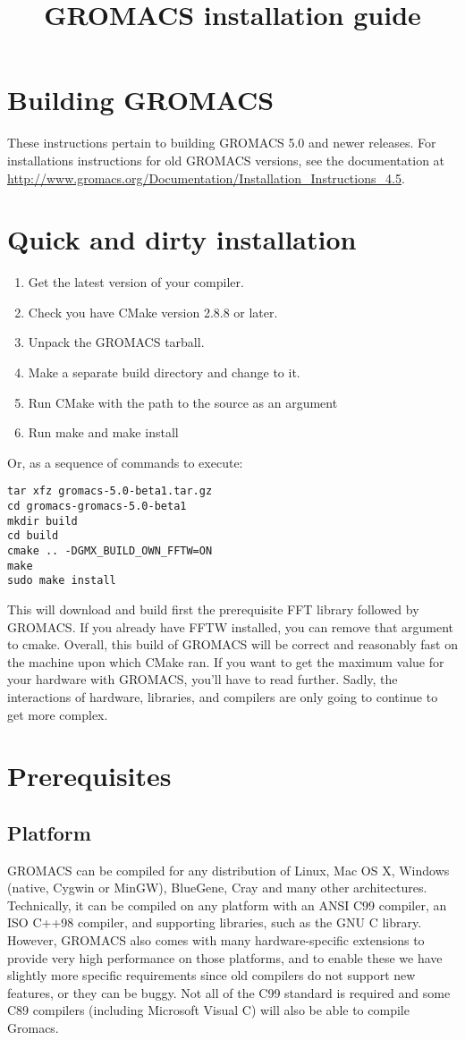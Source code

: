\documentclass{article}[12pt,a4paper,twoside]
\title{GROMACS installation guide}
\newcommand{\gromacs}{GROMACS}
\newcommand{\cmake}{CMake}
\newcommand{\cmakeversion}{2.8.8}
\newcommand{\gromacsversion}{5.0}
\begin{document}
\section{Building GROMACS}

These instructions pertain to building \gromacs{} \gromacsversion{}
and newer releases. For installations instructions for old \gromacs{}
versions, see the documentation at
\url{http://www.gromacs.org/Documentation/Installation_Instructions_4.5}.

\section{Quick and dirty installation}

\begin{enumerate}
\item Get the latest version of your compiler.
\item Check you have \cmake{} version \cmakeversion{} or later.
\item Unpack the \gromacs{} tarball.
\item Make a separate build directory and change to it. 
\item Run \cmake{} with the path to the source as an argument
\item Run make and make install
\end{enumerate}
Or, as a sequence of commands to execute:
\begin{verbatim}
tar xfz gromacs-5.0-beta1.tar.gz
cd gromacs-gromacs-5.0-beta1
mkdir build
cd build
cmake .. -DGMX_BUILD_OWN_FFTW=ON
make
sudo make install
\end{verbatim}
This will download and build first the prerequisite FFT library followed by \gromacs{}. If you already have
FFTW installed, you can remove that argument to cmake. Overall, this build 
of \gromacs{} will be correct and reasonably fast on the
machine upon which \cmake{} ran. If you want to get the maximum value
for your hardware with \gromacs{}, you'll have to read further.
Sadly, the interactions of hardware, libraries, and compilers
are only going to continue to get more complex. 

\section{Prerequisites}
\subsection{Platform}
\gromacs{} can be compiled for any distribution of Linux, Mac OS X,
Windows (native, Cygwin or MinGW), BlueGene, Cray and many other
architectures. Technically, it can be compiled on any platform with
an ANSI C99 compiler, an ISO C++98 compiler, and supporting libraries,
such as the GNU C library. However, \gromacs{} also comes with many
hardware-specific extensions to provide very high performance on those
platforms, and to enable these we have slightly more specific
requirements since old compilers do not support new features, or they
can be buggy. Not all of the C99 standard is required and some C89
compilers (including Microsoft Visual C) will also be able to compile
Gromacs.
\end{document}
